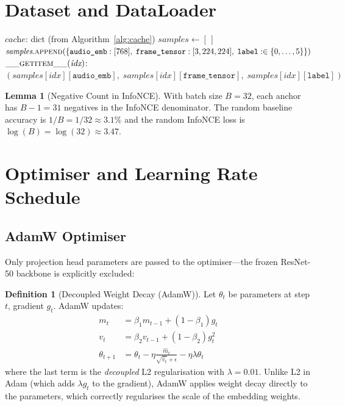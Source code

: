 \documentclass[12pt,a4paper]{article}
\theoremstyle{definition}
\newtheorem{lemma}[theorem]{Lemma}
\newtheorem{definition}[theorem]{Definition}
\theoremstyle{remark}
\begin{document}
\section{Dataset and DataLoader}

\begin{algorithm}[H]
\caption{CREMADDataset Initialisation and Retrieval}
\label{alg:dataset}
\begin{algorithmic}[1]
\Require $\textit{cache}$: dict (from Algorithm~\ref{alg:cache})
\State $\textit{samples} \gets [\,]$
  \State $\textit{samples}.\textsc{append}(\{\texttt{audio\_emb}: [768],\;
    \texttt{frame\_tensor}: [3,224,224],\;\texttt{label}: \in\{0,\ldots,5\}\})$
\EndFor
\State $\textsc{\_\_getitem\_\_}(\textit{idx})$: \Return
    $(\textit{samples}[\textit{idx}][\texttt{audio\_emb}],\;
      \textit{samples}[\textit{idx}][\texttt{frame\_tensor}],\;
      \textit{samples}[\textit{idx}][\texttt{label}])$
\end{algorithmic}
\end{algorithm}

\begin{lemma}[Negative Count in InfoNCE]
With batch size $B = 32$, each anchor has $B - 1 = 31$ negatives in the
InfoNCE denominator. The random baseline accuracy is $1/B = 1/32 \approx 3.1\%$
and the random InfoNCE loss is $\log(B) = \log(32) \approx 3.47$.
\end{lemma}

\section{Optimiser and Learning Rate Schedule}

\subsection{AdamW Optimiser}

Only projection head parameters are passed to the optimiser—the frozen
ResNet-50 backbone is explicitly excluded:

\begin{definition}[Decoupled Weight Decay (AdamW)]
Let $\theta_t$ be parameters at step $t$, gradient $g_t$.
AdamW updates:
\begin{align*}
  m_t &= \beta_1 m_{t-1} + (1-\beta_1) g_t \\
  v_t &= \beta_2 v_{t-1} + (1-\beta_2) g_t^2 \\
  \theta_{t+1} &= \theta_t - \eta \frac{\hat{m}_t}{\sqrt{\hat{v}_t} + \epsilon}
                - \eta \lambda \theta_t
\end{align*}
where the last term is the \emph{decoupled} L2 regularisation with
$\lambda = 0.01$. Unlike L2 in Adam (which adds $\lambda g_t$ to the gradient),
AdamW applies weight decay directly to the parameters, which correctly
regularises the scale of the embedding weights.
\end{definition}
\end{document}
